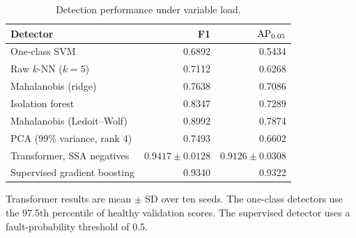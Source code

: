 \begin{table}[!t]
\centering
\caption{Detection performance under variable load.}
\label{tab:variable_load_benchmark}
\footnotesize
\setlength{\tabcolsep}{3pt}
\begin{tabular*}{\columnwidth}{@{\extracolsep{\fill}}lrr@{}}
\toprule
Detector & F1 & $\mathrm{AP}_{0.05}$ \\
\midrule
One-class SVM & 0.6892 & 0.5434 \\
Raw $k$-NN ($k=5$) & 0.7112 & 0.6268 \\
Mahalanobis (ridge) & 0.7638 & 0.7086 \\
Isolation forest & 0.8347 & 0.7289 \\
Mahalanobis (Ledoit--Wolf) & 0.8992 & 0.7874 \\
PCA (99\% variance, rank 4) & 0.7493 & 0.6602 \\
Transformer, SSA negatives & $0.9417 \pm 0.0128$ & $0.9126 \pm 0.0308$ \\
\midrule
Supervised gradient boosting & 0.9340 & 0.9322 \\
\bottomrule
\end{tabular*}
\par\smallskip\parbox{\columnwidth}{Transformer results are mean $\pm$ SD over ten seeds. The one-class detectors use the 97.5th percentile of healthy validation scores. The supervised detector uses a fault-probability threshold of 0.5.}
\end{table}
